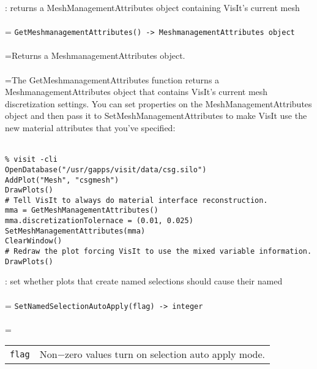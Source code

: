 \documentclass[10pt,a4paper]{report}
\begin{document}
{}
: returns a MeshManagementAttributes object containing VisIt's current mesh\\[-3mm]

 \\ 
\hangindent=\parindent 
\verb!GetMeshmanagementAttributes() -> MeshmanagementAttributes object!\\ [-3mm]

 \\ 
\hangindent=\parindent Returns a MeshmanagementAttributes object. \\[-3mm] 

 \\ 
\hangindent=\parindent The GetMeshmanagementAttributes function returns a MeshmanagementAttributes object that contains VisIt's current mesh discretization settings. You can set properties on the MeshManagementAttributes object and then pass it to SetMeshManagementAttributes to make VisIt use the new material attributes that you've specified: \\[-3mm] 

\\[-6mm]
\begin{verbatim}% visit -cli
OpenDatabase("/usr/gapps/visit/data/csg.silo")
AddPlot("Mesh", "csgmesh")
DrawPlots()
# Tell VisIt to always do material interface reconstruction.
mma = GetMeshManagementAttributes()
mma.discretizationTolernace = (0.01, 0.025)
SetMeshManagementAttributes(mma)
ClearWindow()
# Redraw the plot forcing VisIt to use the mixed variable information.
DrawPlots()
\end{verbatim}
\newpage


{}
: set whether plots that create named selections should cause their named \\[-3mm]

 \\ 
\hangindent=\parindent 
\verb!SetNamedSelectionAutoApply(flag) -> integer!\\ [-3mm]

 \\ 
\hangindent=\parindent 
\begin{tabular}{lp{9cm}}
\verb!flag! & Non$-$zero values turn on selection auto apply mode. \\
\end{tabular} \\[-2mm]
\end{document}

